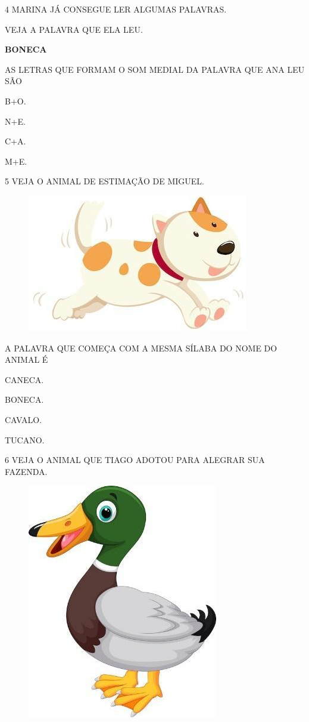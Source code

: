 \num{4} MARINA JÁ CONSEGUE LER ALGUMAS PALAVRAS.

VEJA A PALAVRA QUE ELA LEU.

\begin{myquote}
\textbf{BONECA}
\end{myquote}

\pagebreak
AS LETRAS QUE FORMAM O SOM MEDIAL DA PALAVRA QUE ANA LEU SÃO

\begin{escolha}
\item B+O.

\item N+E.

\item C+A.

\item M+E.
\end{escolha}

\num{5} VEJA O ANIMAL DE ESTIMAÇÃO DE MIGUEL.

\begin{figure}[htpb]
\centering
\includegraphics[width=.55\textwidth]{media/image214.jpg}
\end{figure}

A PALAVRA QUE COMEÇA COM A MESMA SÍLABA DO NOME DO ANIMAL É 

\begin{escolha}
\item CANECA.

\item BONECA.

\item CAVALO.

\item TUCANO.
\end{escolha}

\pagebreak
\num{6} VEJA O ANIMAL QUE TIAGO ADOTOU PARA ALEGRAR SUA FAZENDA.

\begin{figure}[htpb]
\centering
\includegraphics[width=.3\textwidth]{media/image215.jpg}
\end{figure}

